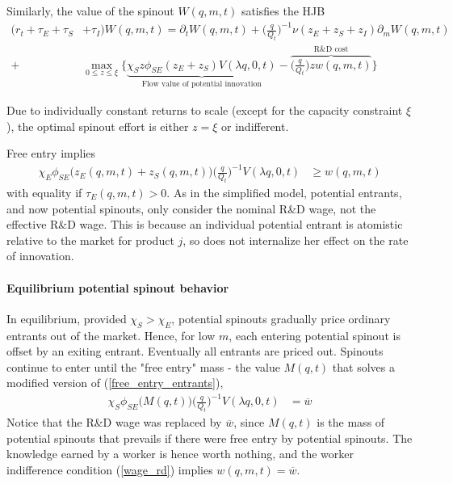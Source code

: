 \documentclass[12pt,english]{article}
\theoremstyle{remark}
\begin{document}
Similarly, the value of the spinout $W(q,m,t)$ satisfies the HJB
\begin{align}
	(r_t + \tau_E + \tau_S& + \tau_I)W(q,m,t) = \partial_t W(q,m,t) +  \Big(\frac{q}{Q_t}\Big)^{-1} \nu (z_E + z_S + z_I) \partial_m W(q,m,t) \nonumber \\
	+& \max_{0 \le z \le \xi} \Big\{ \underbrace{\chi_S z\phi_{SE}(z_E + z_S) V(\lambda q,0,t)}_{\textrm{Flow value of potential innovation}} - \overbrace{\Big(\frac{q}{Q_t}\Big) z w(q,m,t)}^{\textrm{R\&D cost}} \Big\} \label{HJB_S}
\end{align}

Due to individually constant returns to scale (except for the capacity constraint $\xi$), the optimal spinout effort is either $z = \xi$ or indifferent. 

Free entry implies
\begin{align}
\chi_E \phi_{SE}\big( z_E(q,m,t) + z_S(q,m,t) \big) \Big(\frac{q}{Q_t}\Big)^{-1}  V(\lambda q,0,t)  &\ge w(q,m,t)  \label{free_entry_entrants}
\end{align}
with equality if $\tau_E(q,m,t) > 0$. As in the simplified model, potential entrants, and now potential spinouts, only consider the nominal R\&D wage, not the effective R\&D wage. This is because an individual potential entrant is atomistic relative to the market for product $j$, so does not internalize her effect on the rate of innovation.

\paragraph{Equilibrium potential spinout behavior}

In equilibrium, provided $\chi_S > \chi_E$, potential spinouts gradually price ordinary entrants out of the market. Hence, for low $m$, each entering potential spinout is offset by an exiting entrant. Eventually all entrants are priced out. Spinouts continue to enter until the "free entry" mass - the value $M(q,t)$ that solves a modified version of (\ref{free_entry_entrants}),
\begin{align}
	\chi_S \phi_{SE}\big( M(q,t) \big) \Big(\frac{q}{Q_t}\Big)^{-1}  V(\lambda q,0,t)  &= \overline{w}  \label{free_entry_spinouts}
\end{align}
Notice that the R\&D wage was replaced by $\overline{w}$, since $M(q,t)$ is the mass of potential spinouts that prevails if there were free entry by potential spinouts. The knowledge earned by a worker is hence worth nothing, and the worker indifference condition (\ref{wage_rd}) implies $w(q,m,t) = \overline{w}$. 
\end{document}

